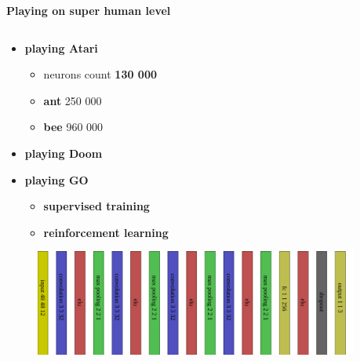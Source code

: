 \documentclass[xcolor=dvipsnames]{beamer}
\begin{document}
\begin{frame}{\bf Playing on super human level}

\begin{columns}
\begin{column}{0.5\textwidth}

    \begin{itemize}
    \item {\bf playing Atari}
       {\footnotesize
        \begin{itemize}
            \item neurons count {\bf 130 000}
            \item {\bf ant}  250 000
            \item {\bf bee}  960 000
        \end{itemize}
        }
    \item {\bf playing Doom}
    \item {\bf playing GO}
                            {
                                \footnotesize
                                {
                                  \begin{itemize}
                                    \item {\bf supervised training}
                                    \item {\bf reinforcement learning}
                                  \end{itemize}
                                }
                             }
    \end{itemize}
    \begin{figure}[!htb]
    \centering
    \includegraphics[scale=0.09]{../../diagrams/rl/atari_network.png}
    \end{figure}


\end{column}
\begin{column}{0.5\textwidth}  %


\end{column}
\end{columns}
\end{frame}
\end{document}
